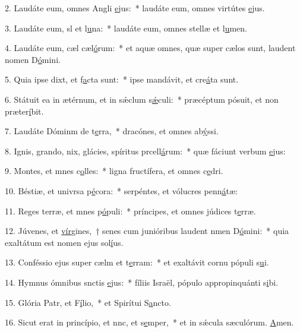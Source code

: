 2. Laudáte eum, omnes Angli \uline{e}jus:~* laudáte eum, omnes virtútes \uline{e}jus.\par 
3. Laudáte eum, sl et l\uline{u}na:~* laudáte eum, omnes stellæ et l\uline{u}men.\par 
4. Laudáte eum, cæl cæl\uline{ó}rum:~* et aquæ omnes, quæ super cælos sunt, laudent nomen D\uline{ó}mini.\par 
5. Quia ipse dixt, et f\uline{a}cta sunt:~* ipse mandávit, et cre\uline{á}ta sunt.\par 
6. Státuit ea in ætérnum, et in sǽclum s\uline{ǽ}culi:~* præcéptum pósuit, et non præter\uline{í}bit.\par 
7. Laudáte Dóminm de t\uline{e}rra,~* dracónes, et omnes ab\uline{ý}ssi.\par 
8. Ignis, grando, nix, glácies, spíritus prcell\uline{á}rum:~* quæ fáciunt verbum \uline{e}jus:\par 
9. Montes, et mnes c\uline{o}lles:~* ligna fructífera, et omnes c\uline{e}dri.\par 
10. Béstiæ, et univrsa p\uline{é}cora:~* serpéntes, et vólucres penn\uline{á}tæ:\par 
11. Reges terræ, et mnes p\uline{ó}puli:~* príncipes, et omnes júdices t\uline{e}rræ.\par 
12. Júvenes, et \uline{vír}gines,~† senes cum junióribus laudent nmen D\uline{ó}mini:~* quia exaltátum est nomen ejus sol\uline{í}us.\par 
13. Conféssio ejus super cælm et t\uline{e}rram:~* et exaltávit cornu pópuli s\uline{u}i.\par 
14. Hymnus ómnibus snctis \uline{e}jus:~* fíliis Israël, pópulo appropinquánti s\uline{i}bi.\par 
15. Glória Patr, et F\uline{í}lio,~* et Spirítui S\uline{a}ncto.\par 
16. Sicut erat in princípio, et nnc, et s\uline{e}mper,~* et in sǽcula sæculórum. \uline{A}men.\par 

